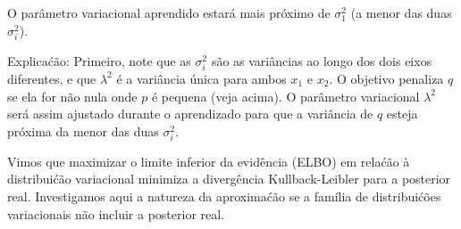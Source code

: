 \begin{exenumerate}
    \begin{solution}
        O par\^ametro variacional aprendido estar\'a mais pr\'oximo de $\sigma_1^2$
        (a menor das duas $\sigma_i^2$).
        
        Explica\'c\~ao: Primeiro, note que as $\sigma_i^2$ s\~ao as vari\^ancias
        ao longo dos dois eixos diferentes, e que $\lambda^2$ \'e a vari\^ancia
        \'unica para ambos $x_1$ e $x_2$. O objetivo penaliza $q$ se ela
        for n\~ao nula onde $p$ \'e pequena (veja acima). O par\^ametro variacional
        $\lambda^2$ ser\'a assim ajustado durante o aprendizado para que a vari\^ancia
        de $q$ esteja pr\'oxima da menor das duas $\sigma_i^2$.
        
    \end{solution}
    
\end{exenumerate}



Vimos que maximizar o limite inferior da evid\^encia (ELBO) em
rela\'c\~ao \`a distribui\'c\~ao variacional minimiza a
diverg\^encia Kullback-Leibler para a posterior real. Investigamos aqui
a natureza da aproxima\'c\~ao se a fam\'ilia de distribui\'c\~oes
variacionais n\~ao incluir a posterior real.

